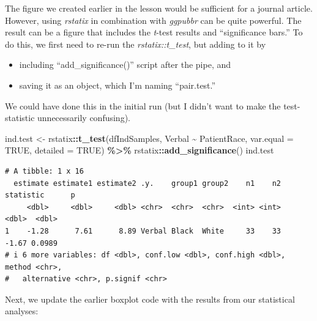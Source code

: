 \documentclass[
  11pt,
]{book}
\newenvironment{Shaded}{\begin{snugshade}}{\end{snugshade}}
\newcommand{\AttributeTok}[1]{\textcolor[rgb]{0.27,0.27,0.27}{#1}}
\newcommand{\ConstantTok}[1]{\textcolor[rgb]{0.37,0.37,0.37}{#1}}
\newcommand{\FunctionTok}[1]{\textcolor[rgb]{0.27,0.27,0.27}{\textbf{#1}}}
\newcommand{\NormalTok}[1]{#1}
\newcommand{\OtherTok}[1]{\textcolor[rgb]{0.37,0.37,0.37}{#1}}
\newcommand{\SpecialCharTok}[1]{\textcolor[rgb]{0.43,0.43,0.43}{\textbf{#1}}}
\providecommand{\tightlist}{%
  \setlength{\itemsep}{0pt}\setlength{\parskip}{0pt}}
\begin{document}
The figure we created earlier in the lesson would be sufficient for a journal article. However, using \emph{rstatix} in combination with \emph{ggpubbr} can be quite powerful. The result can be a figure that includes the \emph{t}-test results and ``significance bars.'' To do this, we first need to re-run the \emph{rstatix::t\_test}, but adding to it by

\begin{itemize}
\tightlist
\item
  including ``add\_significance()'' script after the pipe, and
\item
  saving it as an object, which I'm naming ``pair.test.''
\end{itemize}

We could have done this in the initial run (but I didn't want to make the test-statistic unnecessarily confusing).

\begin{Shaded}
\begin{Highlighting}[]
\NormalTok{ind.test }\OtherTok{\textless{}{-}}\NormalTok{ rstatix}\SpecialCharTok{::}\FunctionTok{t\_test}\NormalTok{(dfIndSamples, Verbal }\SpecialCharTok{\textasciitilde{}}\NormalTok{ PatientRace, }\AttributeTok{var.equal =} \ConstantTok{TRUE}\NormalTok{,}
    \AttributeTok{detailed =} \ConstantTok{TRUE}\NormalTok{) }\SpecialCharTok{\%\textgreater{}\%}
\NormalTok{    rstatix}\SpecialCharTok{::}\FunctionTok{add\_significance}\NormalTok{()}
\NormalTok{ind.test}
\end{Highlighting}
\end{Shaded}

\begin{verbatim}
# A tibble: 1 x 16
  estimate estimate1 estimate2 .y.    group1 group2    n1    n2 statistic      p
     <dbl>     <dbl>     <dbl> <chr>  <chr>  <chr>  <int> <int>     <dbl>  <dbl>
1    -1.28      7.61      8.89 Verbal Black  White     33    33     -1.67 0.0989
# i 6 more variables: df <dbl>, conf.low <dbl>, conf.high <dbl>, method <chr>,
#   alternative <chr>, p.signif <chr>
\end{verbatim}

Next, we update the earlier boxplot code with the results from our statistical analyses:
\end{document}
